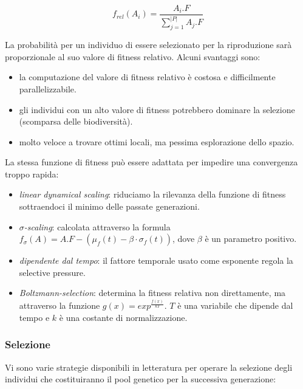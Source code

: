 \documentclass[10pt,a4paper]{article}
\begin{document}
$$
f_{rel}(A_i) = \frac{A_i.F}{\sum_{j=1}^{|P|} A_j.F}
$$

La probabilità per un individuo di essere selezionato per la riproduzione sarà proporzionale al suo valore di fitness relativo. Alcuni svantaggi sono:

\begin{itemize}
\item{la computazione del valore di fitness relativo è costosa e difficilmente parallelizzabile.}
\item{gli individui con un alto valore di fitness potrebbero dominare la selezione (scomparsa delle biodiversità).}
\item{molto veloce a trovare ottimi locali, ma pessima esplorazione dello spazio.}
\end{itemize}

La stessa funzione di fitness può essere adattata per impedire una convergenza troppo rapida:

\begin{itemize}
\item{\emph{linear dynamical scaling}: riduciamo la rilevanza della funzione di fitness sottraendoci il minimo delle passate generazioni.}
\item{\emph{$\sigma$-scaling}: calcolata attraverso la formula $f_{\sigma}(A) = A.F - (\mu_f(t) - \beta \cdot \sigma_f(t))$, dove $\beta$ è un parametro positivo.}
\item{\emph{dipendente dal tempo}: il fattore temporale usato come esponente regola la selective pressure.}
\item{\emph{Boltzmann-selection}: determina la fitness relativa non direttamente, ma attraverso la funzione $g(x) = exp^{\frac{f(x)}{kT}}$. $T$ è una variabile che dipende dal tempo e $k$ è una costante di normalizzazione.}
\end{itemize}

\subsubsection{Selezione}

Vi sono varie strategie disponibili in letteratura per operare la selezione degli individui che costituiranno il pool genetico per la successiva generazione:
\end{document}

